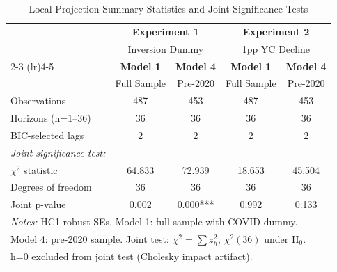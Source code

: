 \begin{table}[htbp]
\centering\small
\caption{Local Projection Summary Statistics and Joint Significance Tests}
\label{tab:lp_summary}
\begin{tabular}{l cccc}
\toprule
 & \multicolumn{2}{c}{\textbf{Experiment 1}} & \multicolumn{2}{c}{\textbf{Experiment 2}} \\
 & \multicolumn{2}{c}{Inversion Dummy} & \multicolumn{2}{c}{1pp YC Decline} \\
\cmidrule(lr){2-3} \cmidrule(lr){4-5}
 & \textbf{Model 1} & \textbf{Model 4} & \textbf{Model 1} & \textbf{Model 4} \\
 & Full Sample & Pre-2020 & Full Sample & Pre-2020 \\
\midrule
Observations & 487 & 453 & 487 & 453 \\
Horizons (h=1--36) & 36 & 36 & 36 & 36 \\
BIC-selected lags & 2 & 2 & 2 & 2 \\
\midrule
\textit{Joint significance test:} & & & & \\
$\chi^2$ statistic & 64.833 & 72.939 & 18.653 & 45.504 \\
Degrees of freedom & 36 & 36 & 36 & 36 \\
Joint p-value & 0.002 & 0.000*** & 0.992 & 0.133 \\
\midrule
\multicolumn{5}{l}{\textit{Notes:} HC1 robust SEs. Model 1: full sample with COVID dummy.} \\
\multicolumn{5}{l}{Model 4: pre-2020 sample. Joint test: $\chi^2=\sum z_h^2$, $\chi^2(36)$ under H$_0$.} \\
\multicolumn{5}{l}{h=0 excluded from joint test (Cholesky impact artifact).} \\
\bottomrule
\end{tabular}
\end{table}
